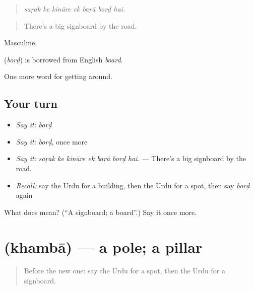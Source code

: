 \begin{quote}
      
\end{quote}

\begin{quote}
\emph{saṛak ke kināre ek baṛā borḍ hai.}
\end{quote}

\begin{quote}
There's a big signboard by the road.
\end{quote}

Masculine.

\begin{cousinweb}
\textbf{} (\emph{borḍ}) is borrowed from English \emph{board}.
\end{cousinweb}

\begin{grammarlens}[title={What you've built}]
One more word for getting around.
\end{grammarlens}

\subsection*{Your turn}
\begin{itemize}
\raggedright
  \item \emph{Say it:} \emph{borḍ}
  \item \emph{Say it:} \emph{borḍ}, once more
  \item \emph{Say it:} \emph{saṛak ke kināre ek baṛā borḍ hai.} — There's a big signboard by the road.
  \item \emph{Recall:} say the Urdu for a building, then the Urdu for a spot, then say \emph{borḍ} again
\end{itemize}

\begin{tcolorbox}[breakable,colback=teal!4,colframe=teal!35!black,title={Before you move on}]
What does  mean? (\textquotedblleft{}A signboard; a board\textquotedblright{}.) Say it once more.
\end{tcolorbox}
\section[\texorpdfstring{\ur{کھمبا} (khambā)}{کھمبا (khambā)}]{ (khambā) — a pole; a pillar}

\label{lesson:UR-C410-khamba}



\begin{quote}
Before the new one: say the Urdu for a spot, then the Urdu for a signboard.
\end{quote}


